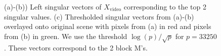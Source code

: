 \begin{figure}
  \begin{center}
    \caption{(a)-(b)) Left singular vectors of $X_{\text{video}}$ corresponding to the top
      2 singular values. (c) Thresholded singular vectors from (a)-(b) overlayed onto
      original scene with pixels from (a) in red and pixels from (b) in green. We use the
      threshold $\log(p)/\sqrt{p}$ for $p=33250$. These vectors correspond to the 2 block M's.}
    \label{fig:chpt4:av_vu}
  \end{center}
\end{figure}

